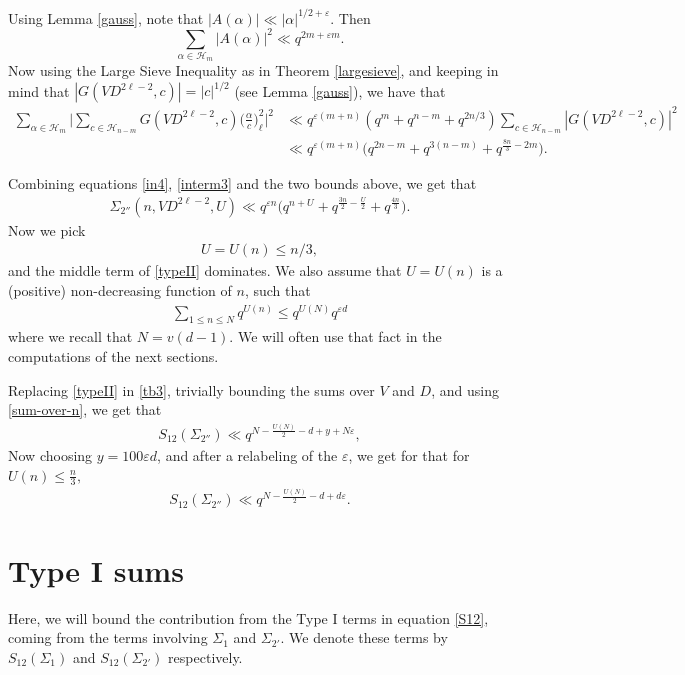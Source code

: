 \documentclass[12pt]{amsart}
\begin{document}
Using Lemma \ref{gauss}, note that $|A(\alpha) | \ll |\alpha|^{1/2+\varepsilon}$. Then
$$\sum_{\alpha \in \mathcal{H}_m} |A(\alpha)|^2  \ll q^{2m+\varepsilon m}.$$
Now using the Large Sieve Inequality as in Theorem \ref{largesieve}, and keeping in mind that $|G(VD^{2\ell-2},c)|=|c|^{1/2}$ (see Lemma \ref{gauss}), we have that
\begin{align*}
\sum_{\alpha \in \mathcal{H}_m}  \Big| \sum_{c \in \mathcal{H}_{n-m}} G(VD^{2\ell-2},c) \Big(\frac{\alpha}{c} \Big)_{\ell}^2 \Big|^2  & \ll q^{\varepsilon(m+n)} (q^m+q^{n-m}+q^{2n/3}) \sum_{c \in \mathcal{H}_{n-m}} |G(VD^{2\ell-2},c)|^2 \\
& \ll q^{\varepsilon(m+n)} \Big(q^{2n-m} + q^{3(n-m)}+q^{\frac{8n}{3}-2m} \Big).
\end{align*}

Combining equations \eqref{in4}, \eqref{interm3} and the two bounds above, we get that 
\begin{align}
\label{typeII}
\Sigma_{2''}(n,VD^{2\ell-2},U)  \ll q^{\varepsilon n } \Big( q^{n+U} + q^{\frac{3n}{2}-\frac{U}{2}} + q^{\frac{4n}{3}}\Big).
\end{align}
Now we pick 
\begin{align*} %
 U=U(n) \leq n/3,
 \end{align*} and the middle term of \eqref{typeII}
 dominates. 
We also assume that $U=U(n)$ is a (positive) non-decreasing function of $n$, such that
\begin{align} \label{sum-over-n}
 \sum_{1 \leq n \leq N} q^{U(n)} \leq q^{U(N)} q^{\varepsilon d}
\end{align}
where we recall that $N=v(d-1)$. We will often use that fact in the computations of the next sections.


Replacing \eqref{typeII} in  \eqref{tb3}, trivially bounding the sums over $V$ and $D$, and using \eqref{sum-over-n}, we get that 
\begin{align*}
S_{12}(\Sigma_{2''}) \ll q^{N-\frac{U(N)}{2}-d+y+N\varepsilon},
\end{align*}
Now choosing $y = 100\varepsilon d$, and after a  relabeling of the $\varepsilon$, we get for that for $U(n) \leq \tfrac{n}{3},$
\begin{align}
\label{s12sigma2''}
S_{12}(\Sigma_{2''}) \ll q^{N-\frac{U(N)}{2}-d+d \varepsilon}.
\end{align}



\section{Type I sums}
\label{typeI}
Here, we will bound the contribution from the Type I terms in equation \eqref{S12}, coming from the terms involving $\Sigma_1$ and $\Sigma_{2'}$. We denote these terms by $S_{12}(\Sigma_1)$ and $S_{12}(\Sigma_{2'})$ respectively. 
\end{document}
